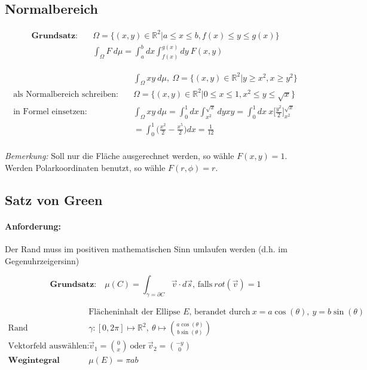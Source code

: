 \documentclass[11pt]{article}
\begin{document}
\subsection{Normalbereich}

\begin{equation*}
\begin{split}
	\textbf{Grundsatz:}\quad & \Omega = \{(x,y) \in \mathbb{R}^2| a \leq x \leq b, f(x) \leq y \leq g(x)\} \\
	& \int_\Omega F\ d\mu = \int_a^b dx \int_{f(x)}^{g(x)} dy\ F(x,y)
\end{split}
\end{equation*}

\begin{equation*}
\begin{split}
	& \int_\Omega xy\ d\mu,\ \Omega = \{(x,y) \in \mathbb{R}^2| y \geq x^2, x \geq y^2 \} \\
	\text{als Normalbereich schreiben:}\quad & \Omega = \{(x,y) \in \mathbb{R}^2| 0 \leq x \leq 1, x^2 \leq y \leq \sqrt{x}\} \\
	\text{in Formel einsetzen:}\quad & \int_\Omega xy\ d\mu = \int_0^1 dx\int_{x^2}^{\sqrt{x}} dyxy = \int_0^1 dx\ x \Big[\frac{y^2}{2}\Big]_{x^2}^{\sqrt{x}} \\
	& = \int_0^1 \Big(\frac{x^2}{2}-\frac{x^5}{2}\Big)dx = \frac{1}{12} \\
\end{split}
\end{equation*}

\emph{Bemerkung:} Soll nur die Fl{\"a}che ausgerechnet werden, so w{\"a}hle $F(x,y) = 1$. Werden Polarkoordinaten benutzt, so w{\"a}hle $F(r, \phi) = r$.

\subsection{Satz von Green}

\paragraph{Anforderung:} Der Rand muss im positiven mathematischen Sinn umlaufen werden (d.h. im Gegenuhrzeigersinn)

\begin{equation*}
	\textbf{Grundsatz:}\quad \mu(C) = \int_{\gamma = \partial C} \vec{v} \cdot d\vec{s}\text{, falls}\ rot(\vec{v}) = 1
\end{equation*}

\begin{equation*}
\begin{split}
	& \text{Fl{\"a}cheninhalt der Ellipse $E$, berandet durch}\ x = a\cos(\theta),\ y = b\sin(\theta) \\
	\text{Rand parametrisieren:}\quad & \gamma: [0, 2\pi] \mapsto \mathbb{R}^2,\ \theta \mapsto \binom{a\cos(\theta)}{b\sin(\theta)} \\
	\text{Vektorfeld ausw{\"a}hlen:}\quad & \vec{v}_1 = \binom{0}{x}\ \text{oder}\ \vec{v}_2 = \binom{-y}{0} \\
	\textbf{Wegintegral ausrechnen:}\quad & \mu(E) = \pi ab
\end{split}
\end{equation*}
\end{document}
